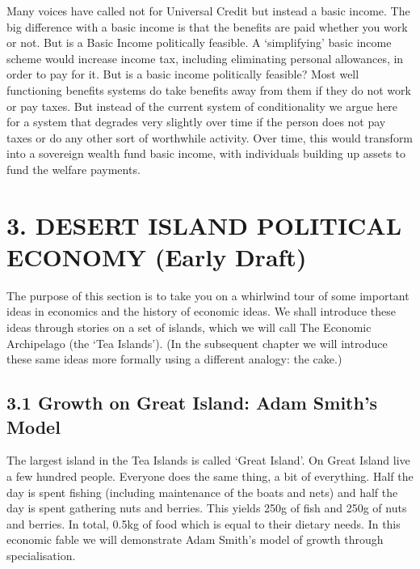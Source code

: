 \documentclass[]{tufte-handout}
\begin{document}
Many voices have called not for Universal Credit but instead a basic
income. The big difference with a basic income is that the benefits are
paid whether you work or not. But is a Basic Income politically
feasible. A `simplifying' basic income scheme would increase income tax,
including eliminating personal allowances, in order to pay for it. But
is a basic income politically feasible? Most well functioning benefits
systems do take benefits away from them if they do not work or pay
taxes. But instead of the current system of conditionality we argue here
for a system that degrades very slightly over time if the person does
not pay taxes or do any other sort of worthwhile activity. Over time,
this would transform into a sovereign wealth fund basic income, with
individuals building up assets to fund the welfare payments.

\newpage

\hypertarget{desert-island-political-economy-early-draft}{%
\section{3. DESERT ISLAND POLITICAL ECONOMY (Early
Draft)}\label{desert-island-political-economy-early-draft}}

The purpose of this section is to take you on a whirlwind tour of some
important ideas in economics and the history of economic ideas. We shall
introduce these ideas through stories on a set of islands, which we will
call The Economic Archipelago (the `Tea Islands'). (In the subsequent
chapter we will introduce these same ideas more formally using a
different analogy: the cake.)

\hypertarget{growth-on-great-island-adam-smiths-model}{%
\subsection{3.1 Growth on Great Island: Adam Smith's
Model}\label{growth-on-great-island-adam-smiths-model}}

The largest island in the Tea Islands is called `Great Island'. On Great
Island live a few hundred people. Everyone does the same thing, a bit of
everything. Half the day is spent fishing (including maintenance of the
boats and nets) and half the day is spent gathering nuts and berries.
This yields 250g of fish and 250g of nuts and berries. In total, 0.5kg
of food which is equal to their dietary needs. In this economic fable we
will demonstrate Adam Smith's model of growth through specialisation.
\end{document}
